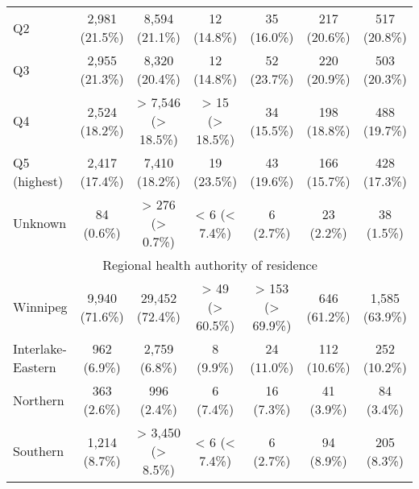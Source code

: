 \documentclass{article}
\begin{document}
\begin{table}[htbp]
\begin{tabular}{l*{6}{c}}
  Q2                                                    &          2,981 (21.5\%)         &          8,594 (21.1\%)         &           12 (14.8\%)           &           35 (16.0\%)           &           217 (20.6\%)          &           517 (20.8\%)          \\
  Q3                                                    &          2,955 (21.3\%)         &          8,320 (20.4\%)         &           12 (14.8\%)           &           52 (23.7\%)           &           220 (20.9\%)          &           503 (20.3\%)          \\
  Q4                                                    &          2,524 (18.2\%)         &        > 7,546 (> 18.5\%)       &         > 15 (> 18.5\%)         &           34 (15.5\%)           &           198 (18.8\%)          &           488 (19.7\%)          \\
  Q5 (highest)                                          &          2,417 (17.4\%)         &          7,410 (18.2\%)         &           19 (23.5\%)           &           43 (19.6\%)           &           166 (15.7\%)          &           428 (17.3\%)          \\
  Unknown                                               &            84 (0.6\%)           &         > 276 (> 0.7\%)         &          < 6 (< 7.4\%)          &            6 (2.7\%)            &            23 (2.2\%)           &            38 (1.5\%)           \\
\multicolumn{7}{c}{Regional health authority of residence                  }\\
  Winnipeg                                              &          9,940 (71.6\%)         &         29,452 (72.4\%)         &         > 49 (> 60.5\%)         &         > 153 (> 69.9\%)        &           646 (61.2\%)          &          1,585 (63.9\%)         \\
  Interlake-Eastern                                     &           962 (6.9\%)           &          2,759 (6.8\%)          &            8 (9.9\%)            &           24 (11.0\%)           &           112 (10.6\%)          &           252 (10.2\%)          \\
  Northern                                              &           363 (2.6\%)           &           996 (2.4\%)           &            6 (7.4\%)            &            16 (7.3\%)           &            41 (3.9\%)           &            84 (3.4\%)           \\
  Southern                                              &          1,214 (8.7\%)          &        > 3,450 (> 8.5\%)        &          < 6 (< 7.4\%)          &            6 (2.7\%)            &            94 (8.9\%)           &           205 (8.3\%)           \\

\end{tabular}
\end{table}
\end{document}
